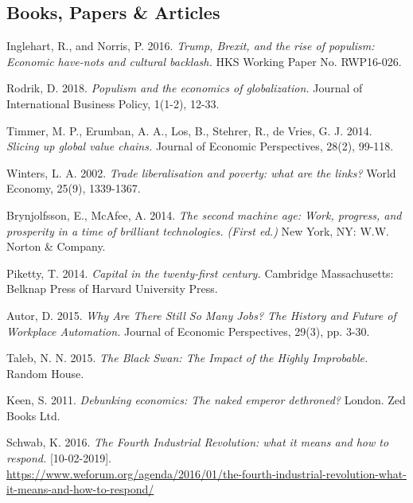 \clearpage


\begin{thebibliography}{25}


\section*{Books, Papers \& Articles}

Inglehart, R., and Norris, P. 2016. \emph{Trump, Brexit, and the rise of populism: Economic have-nots and cultural backlash.} HKS Working Paper No. RWP16-026.

Rodrik, D. 2018. \emph{Populism and the economics of globalization.} Journal of International Business Policy, 1(1-2), 12-33.

Timmer, M. P., Erumban, A. A., Los, B., Stehrer, R., de Vries, G. J. 2014. \emph{Slicing up global value chains.} Journal of Economic Perspectives, 28(2), 99-118.

Winters, L. A. 2002. \emph{Trade liberalisation and poverty: what are the links?} World Economy, 25(9), 1339-1367.

Brynjolfsson, E., McAfee, A. 2014. \emph{The second machine age: Work, progress, and prosperity in a time of brilliant technologies. (First ed.)} New York, NY: W.W. Norton \& Company.

Piketty, T. 2014. \emph{Capital in the twenty-first century.} Cambridge Massachusetts: Belknap Press of Harvard University Press.

Autor, D. 2015. \emph{Why Are There Still So Many Jobs? The History and Future of Workplace Automation.} Journal of Economic Perspectives, 29(3), pp. 3-30.

 Taleb, N. N. 2015. \emph{The Black Swan: The Impact of the Highly Improbable.} Random House.

Keen, S. 2011. \emph{Debunking economics: The naked emperor dethroned?}
London. Zed Books Ltd.

Schwab, K. 2016. \emph{The Fourth Industrial Revolution: what it means and how to respond.} [10-02-2019].\\ \url{https://www.weforum.org/agenda/2016/01/the-fourth-industrial-revolution-what-it-means-and-how-to-respond/}


\end{thebibliography}
